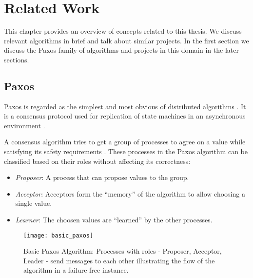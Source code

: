 \chapter{Related Work}
\label{chapter:related.work}

This chapter provides an overview of concepts related to this thesis. We
discuss relevant algorithms in brief and talk about similar projects. In the 
first section we discuss the Paxos family of algorithms and projects in 
this domain in the later sections.

\section{Paxos}

Paxos is regarded as the simplest and most obvious of distributed algorithms 
\citep{Lamport01}. It is a consensus protocol used for replication of state
machines in an asynchronous environment \citep{Lamport98}.

A consensus algorithm tries to get a group of processes to agree on a value 
while satisfying its safety requirements%
. 
These processes in the Paxos algorithm can be classified based on their roles
without affecting its correctness:

\begin{itemize}
  \item \emph{Proposer}: A process that can propose values to the group. 
  \item \emph{Acceptor}: Acceptors form the ``memory'' of the algorithm to 
    allow choosing a single value.
  \item \emph{Learner}: The choosen values are ``learned'' by the other 
    processes.
\end{itemize}

\begin{figure}
  \captionstyle{\raggedright}
  \begin{whole}
    \begin{minipage}[t]{\wholewidth}
      \texttt{[image: basic\_paxos]}
      \caption[Basic Paxos]{%
        Basic Paxos Algorithm: Processes with roles - Proposer, Acceptor, Leader
        - send messages to each other illustrating the flow of the algorithm in
        a failure free instance.}
      \label{figure:basic_paxos}
    \end{minipage}
  \end{whole}
  \normalcaption
\end{figure}

